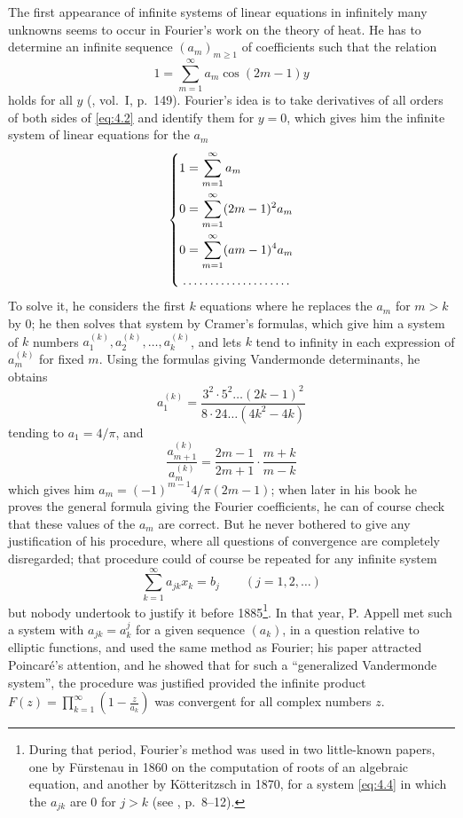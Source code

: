 \documentclass[12pt,a4paper,leqno,twoside]{extbook}
\begin{document}
The first appearance of infinite systems of linear equations in infinitely many unknowns seems to occur in Fourier's work on the theory of heat. He has to determine an infinite sequence \((a_m)_{m \geq 1}\) of coefficients such that the relation
\begin{equation}
    \label{eq:4.2}
    1 = \sum_{m=1}^\infty a_m \cos(2m - 1)y
\end{equation}
holds for all \(y\) (\cite{067}, vol.~I, p.~149). Fourier's idea is to take derivatives of all orders of both sides of \eqref{eq:4.2} and identify them for \(y = 0\), which gives him the infinite system of linear equations for the \(a_m\)
\begin{equation}
    \label{eq:4.3}
    \begin{dcases}
        1 = \sum_{m=1}^\infty a_m \\
        0 = \sum_{m=1}^\infty (2m - 1)^2 a_m \\
        0 = \sum_{m=1}^\infty (am-1)^4 a_m \\
        \dotfill
    \end{dcases}
\end{equation}
To solve it, he considers the first \(k\) equations where he replaces the \(a_m\) for \(m > k\) by 0; he then solves that system by Cramer's formulas, which give him a system of \(k\) numbers \(a_1^{(k)}, a_2^{(k)}, \ldots, a^{(k)}_k\), and lets \(k\) tend to infinity in each expression of \(a_m^{(k)}\) for fixed \(m\). Using the formulas giving Vandermonde determinants, he obtains
\[
    a_1^{(k)} = \frac{3^2 \cdot 5^2 \ldots (2k-1)^2}{8 \cdot 24 \ldots (4k^2 - 4k)}
\]
tending to \(a_1 = 4/\pi\), and
\[
    \frac{a_{m+1}^{(k)}}{a_m^{(k)}} = \frac{2m-1}{2m+1} \cdot \frac{m+k}{m-k}
\]
which gives him \(a_m = (-1)^{m-1} 4/\pi(2m-1)\); when later in his book he proves the general formula giving the Fourier coefficients, he can of course check that these values of the \(a_m\) are correct. But he never bothered to give any justification of his procedure, where all questions of convergence are completely disregarded; that procedure could of course be repeated for any infinite system
\begin{equation}
    \label{eq:4.4}
    \sum_{k=1}^\infty a_{jk} x_k = b_j \qquad (j = 1, 2, \ldots)
\end{equation}
but nobody undertook to justify it before 1885\footnote{During that period, Fourier's method was used in two little-known papers, one by Fürstenau in 1860 on the computation of roots of an algebraic equation, and another by Kötteritzsch in 1870, for a system \eqref{eq:4.4} in which the \(a_{jk}\) are 0 for \(j > k\) (see \cite{184}, p.~8--12).}. In that year, P. Appell met such a system with \(a_{jk} = a_k^j\) for a given sequence \((a_k)\), in a question relative to elliptic functions, and used the same method as Fourier; his paper attracted Poincaré's attention, and he showed that for such a ``generalized Vandermonde system'', the procedure was justified provided the infinite product \(F(z) = \prod\limits_{k=1}^\infty \left( 1 - \frac{z}{a_k} \right)\) was convergent for all complex numbers \(z\).
\end{document}

